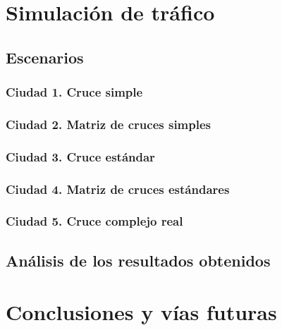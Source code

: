 \part{Simulación de tráfico}
\chapter{Escenarios}
\section{Ciudad 1. Cruce simple}
\section{Ciudad 2. Matriz de cruces simples}
\section{Ciudad 3. Cruce estándar}
\section{Ciudad 4. Matriz de cruces estándares}
\section{Ciudad 5. Cruce complejo real}

\chapter{Análisis de los resultados obtenidos}

\part{Conclusiones y vías futuras}
